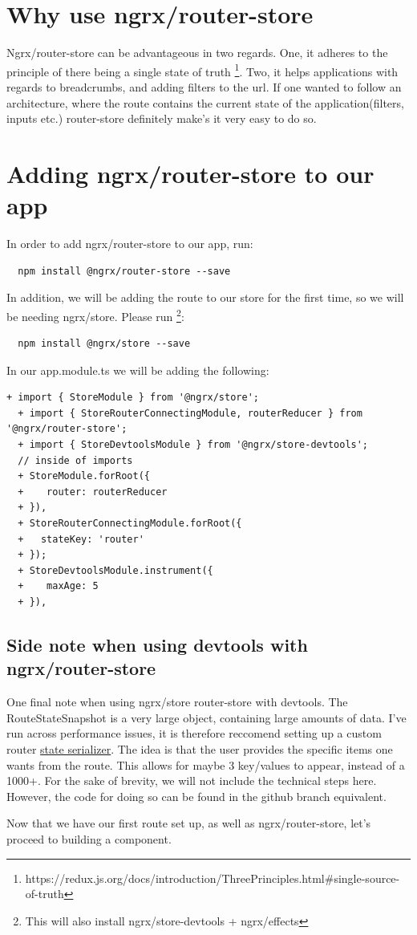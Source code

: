 \section{ Why use ngrx/router-store }

Ngrx/router-store can be advantageous in two regards. One, it adheres to the
principle of there being a single state of truth \footnote{https://redux.js.org/docs/introduction/ThreePrinciples.html\#single-source-of-truth}.
Two, it helps applications with regards to breadcrumbs, and adding filters to the
url. If one wanted to follow an architecture, where the route contains the current
state of the application(filters, inputs etc.) router-store definitely make's it
very easy to do so.

\section{ Adding ngrx/router-store to our app }

In order to add ngrx/router-store to our app, run:
\begin{verbatim}
  npm install @ngrx/router-store --save
\end{verbatim}

In addition, we will be adding the route to our store for the first time, so we
will be needing ngrx/store. Please run \footnote{This will also install ngrx/store-devtools + ngrx/effects}:
\begin{verbatim}
  npm install @ngrx/store --save
\end{verbatim}

In our app.module.ts we will be adding the following:
\begin{lstlisting}[caption=My Javascript Example]
  + import { StoreModule } from '@ngrx/store';
  + import { StoreRouterConnectingModule, routerReducer } from '@ngrx/router-store';
  + import { StoreDevtoolsModule } from '@ngrx/store-devtools';
  // inside of imports
  + StoreModule.forRoot({
  +    router: routerReducer
  + }),
  + StoreRouterConnectingModule.forRoot({
  +   stateKey: 'router'
  + });
  + StoreDevtoolsModule.instrument({
  +    maxAge: 5
  + }),
\end{lstlisting}

\subsection{ Side note when using devtools with ngrx/router-store }

One final note when using ngrx/store router-store with devtools. The
RouteStateSnapshot is a very large object, containing large amounts of data. I've
run across performance issues, it is therefore reccomend setting up a
custom router \href{https://github.com/ngrx/platform/blob/master/docs/router-store/api.md\#custom-router-state-serializer}{state serializer}.
The idea is that the user provides the specific items one wants from the route.
This allows for maybe 3 key/values to appear, instead of a 1000+. For the sake of
brevity, we will not include the technical steps here. However, the code for doing
so can be found in the github branch equivalent.

Now that we have our first route set up, as well as ngrx/router-store, let's proceed
to building a component.
